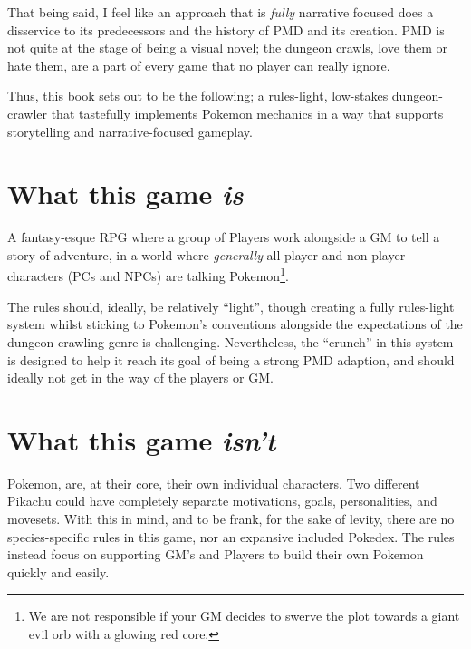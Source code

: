 \documentclass[
  11pt,
  letterpaper,
]{scrbook}
\begin{document}
That being said, I feel like an approach that is \emph{fully} narrative
focused does a disservice to its predecessors and the history of PMD and
its creation. PMD is not quite at the stage of being a visual novel; the
dungeon crawls, love them or hate them, are a part of every game that no
player can really ignore.

Thus, this book sets out to be the following; a rules-light, low-stakes
dungeon-crawler that tastefully implements Pokemon mechanics in a way
that supports storytelling and narrative-focused gameplay.

\newpage

\section*{\texorpdfstring{What this game
\emph{is}}{What this game is}}\label{what-this-game-is}


A fantasy-esque RPG where a group of Players work alongside a GM to tell
a story of adventure, in a world where \emph{generally} all player and
non-player characters (PCs and NPCs) are talking Pokemon\footnote{We are
  not responsible if your GM decides to swerve the plot towards a giant
  evil orb with a glowing red core.}.

The rules should, ideally, be relatively ``light'', though creating a
fully rules-light system whilst sticking to Pokemon's conventions
alongside the expectations of the dungeon-crawling genre is challenging.
Nevertheless, the ``crunch'' in this system is designed to help it reach
its goal of being a strong PMD adaption, and should ideally not get in
the way of the players or GM.

\section*{\texorpdfstring{What this game
\emph{isn't}}{What this game isn't}}\label{what-this-game-isnt}


Pokemon, are, at their core, their own individual characters. Two
different Pikachu could have completely separate motivations, goals,
personalities, and movesets. With this in mind, and to be frank, for the
sake of levity, there are no species-specific rules in this game, nor an
expansive included Pokedex. The rules instead focus on supporting GM's
and Players to build their own Pokemon quickly and easily.
\end{document}
